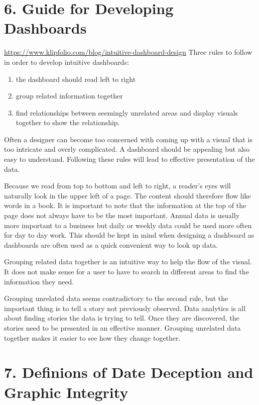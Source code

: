\documentclass[]{book}
\providecommand{\tightlist}{%
  \setlength{\itemsep}{0pt}\setlength{\parskip}{0pt}}
\theoremstyle{definition}
\theoremstyle{definition}
\theoremstyle{definition}
\theoremstyle{remark}
\begin{document}
\section{6. Guide for Developing
Dashboards}\label{guide-for-developing-dashboards}

\url{https://www.klipfolio.com/blog/intuitive-dashboard-design} Three
rules to follow in order to develop intuitive dashboards:

\begin{enumerate}
\def\labelenumi{\arabic{enumi}.}
\tightlist
\item
  the dashboard should read left to right
\item
  group related information together
\item
  find relationships between seemingly unrelated areas and display
  visuals together to show the relationship.
\end{enumerate}

Often a designer can become too concerned with coming up with a visual
that is too intricate and overly complicated. A dashboard should be
appealing but also easy to understand. Following these rules will lead
to effective presentation of the data.

Because we read from top to bottom and left to right, a reader's eyes
will naturally look in the upper left of a page. The content should
therefore flow like words in a book. It is important to note that the
information at the top of the page does not always have to be the most
important. Annual data is usually more important to a business but daily
or weekly data could be used more often for day to day work. This should
be kept in mind when designing a dashboard as dashboards are often used
as a quick convenient way to look up data.

Grouping related data together is an intuitive way to help the flow of
the visual. It does not make sense for a user to have to search in
different areas to find the information they need.

Grouping unrelated data seems contradictory to the second rule, but the
important thing is to tell a story not previously observed. Data
analytics is all about finding stories the data is trying to tell. Once
they are discovered, the stories need to be presented in an effective
manner. Grouping unrelated data together makes it easier to see how they
change together.

\section{7. Definions of Date Deception and Graphic
Integrity}\label{definions-of-date-deception-and-graphic-integrity}
\end{document}
